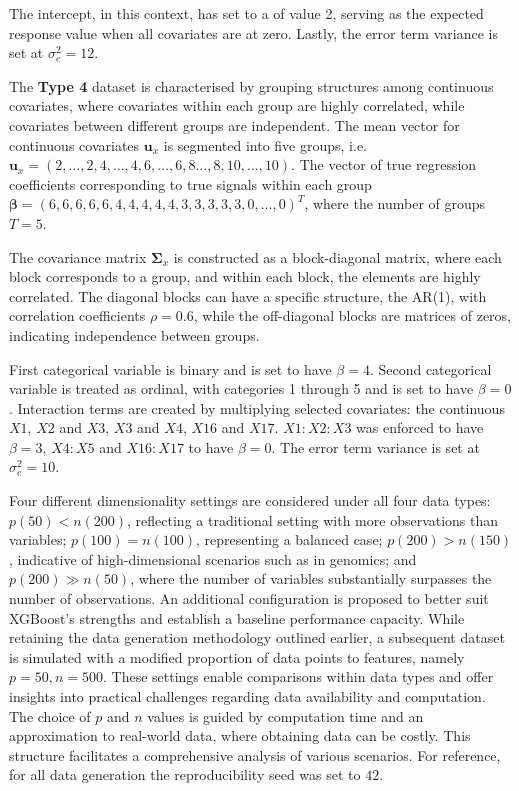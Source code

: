 \documentclass[
  11pt,
]{article}
\begin{document}
The intercept, in this context, has set to a of value 2, serving as the
expected response value when all covariates are at zero. Lastly, the
error term variance is set at \(\sigma_e^2 = 12\).

\hfill\break

The \textbf{Type 4} dataset is characterised by grouping structures
among continuous covariates, where covariates within each group are
highly correlated, while covariates between different groups are
independent. The mean vector for continuous covariates \(\mathbf{u}_x\)
is segmented into five groups,
i.e.~\(\mathbf{u}_x = (2, \ldots, 2, 4, \ldots, 4, 6, \ldots, 6, 8 \ldots, 8, 10, \ldots, 10)\).
The vector of true regression coefficients corresponding to true signals
within each group
\(\boldsymbol{\beta} = (6, 6, 6, 6, 6, 4, 4, 4, 4, 4, 3, 3, 3, 3, 3, 0, \ldots, 0)^T\),
where the number of groups \(T = 5\).

The covariance matrix \(\mathbf{\Sigma}_x\) is constructed as a
block-diagonal matrix, where each block corresponds to a group, and
within each block, the elements are highly correlated. The diagonal
blocks can have a specific structure, the AR(1), with correlation
coefficients \(\rho = 0.6\), while the off-diagonal blocks are matrices
of zeros, indicating independence between groups.

First categorical variable is binary and is set to have \(\beta = 4\).
Second categorical variable is treated as ordinal, with categories 1
through 5 and is set to have \(\beta = 0\). Interaction terms are
created by multiplying selected covariates: the continuous \(X1\),
\(X2\) and \(X3\), \(X3\) and \(X4\), \(X16\) and \(X17\). \(X1:X2:X3\)
was enforced to have \(\beta = 3\), \(X4 : X5\) and \(X16 : X17\) to
have \(\beta = 0\). The error term variance is set at
\(\sigma_e^2 = 10\).

Four different dimensionality settings are considered under all four
data types: \(p(50) < n(200)\), reflecting a traditional setting with
more observations than variables; \(p(100) = n(100)\), representing a
balanced case; \(p(200) > n(150)\), indicative of high-dimensional
scenarios such as in genomics; and \(p(200) \gg n(50)\), where the
number of variables substantially surpasses the number of observations.
An additional configuration is proposed to better suit XGBoost's
strengths and establish a baseline performance capacity. While retaining
the data generation methodology outlined earlier, a subsequent dataset
is simulated with a modified proportion of data points to features,
namely \(p=50, n=500\). These settings enable comparisons within data
types and offer insights into practical challenges regarding data
availability and computation. The choice of \(p\) and \(n\) values is
guided by computation time and an approximation to real-world data,
where obtaining data can be costly. This structure facilitates a
comprehensive analysis of various scenarios. For reference, for all data
generation the reproducibility seed was set to \(42\).
\end{document}
